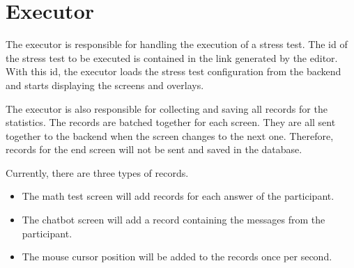 \section{Executor}
\label{sec:executor}

The executor is responsible for handling the execution of a stress test.
The id of the stress test to be executed is contained in the link generated by the editor.
With this id, the executor loads the stress test configuration from the backend and starts displaying the screens and overlays.

The executor is also responsible for collecting and saving all records for the statistics.
The records are batched together for each screen.
They are all sent together to the backend when the screen changes to the next one.
Therefore, records for the end screen will not be sent and saved in the database.

Currently, there are three types of records.
\begin{itemize}
    \item The math test screen will add records for each answer of the participant.
    \item The chatbot screen will add a record containing the messages from the participant.
    \item The mouse cursor position will be added to the records once per second.
\end{itemize}
